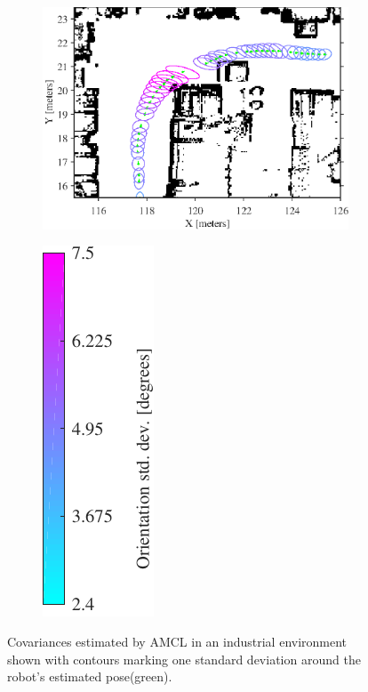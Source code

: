 \begin{figure}[htbp]
	\centering
	\begin{subfigure}[t]{0.8\textwidth}
		\includegraphics[scale=1.0]{figures/static_mapping/scan_region_with_poses}		
	\end{subfigure}
	\begin{subfigure}[t]{0.15\textwidth}
		\includegraphics[scale=1.0]{chapters/evaluation/figures/localization_std_color_bar-crop}
	\end{subfigure}
	\caption{Covariances estimated by AMCL in an industrial environment shown with contours marking one standard deviation around the robot's estimated pose(green).}
    \label{fig:amcl_covariance}
\end{figure}

